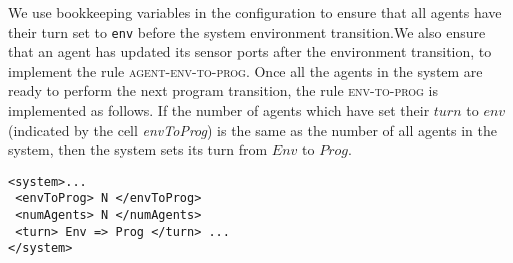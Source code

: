 We use bookkeeping variables in the \K configuration to ensure that all agents have their turn set to \texttt{env} before the system environment transition.We also  ensure that an agent has updated its sensor ports after the environment transition, to implement the rule \textsc{agent-env-to-prog}. Once all the agents in the system are ready to perform the next program transition, the rule \textsc{env-to-prog} is implemented as follows. If the number of agents which have set their $\mathit{turn}$ to $\mathit{env}$ (indicated by the cell {\em envToProg}) is the same as the number of all agents in the system, then the system sets its turn from $\mathit{Env}$ to $\mathit{Prog}$. 
\vspace{2pt}
\begin{mdframed}
\begin{Verbatim}[fontsize=\tiny]
<system>...
 <envToProg> N </envToProg>
 <numAgents> N </numAgents>  
 <turn> Env => Prog </turn> ... 
</system>                      
\end{Verbatim}
\end{mdframed}